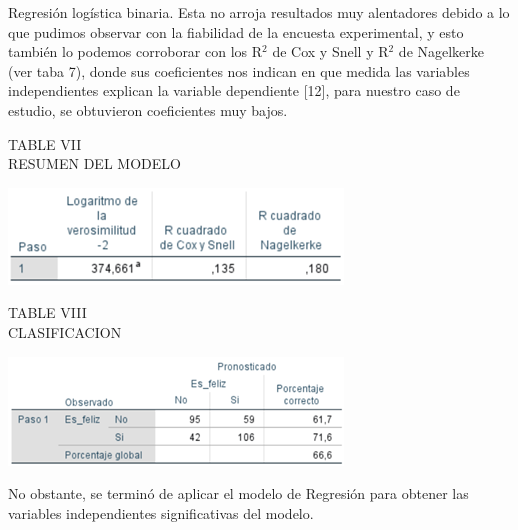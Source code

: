 \documentclass[conference]{IEEEtran}
\begin{document}
   Regresión logística binaria. Esta no arroja resultados muy alentadores debido a lo que pudimos observar con la fiabilidad de la encuesta experimental, y esto también lo podemos corroborar con los R$^2$  de Cox y Snell y R$^2$ de Nagelkerke (ver taba 7), donde sus coeficientes nos indican en que medida las variables independientes explican la variable dependiente [12], para nuestro caso de estudio, se obtuvieron coeficientes muy bajos.\\
\begin{center}
\caption{TABLE VII\\
RESUMEN DEL MODELO}
\includegraphics{imagenes/IMAGEN21.png}
\end{center}
\begin{center}
\caption{TABLE VIII\\
CLASIFICACION}
\includegraphics{imagenes/IMAGEN23.png}
\end{center}
  No obstante, se terminó de aplicar el modelo de Regresión para obtener las variables independientes significativas del modelo.\\
\end{document}
